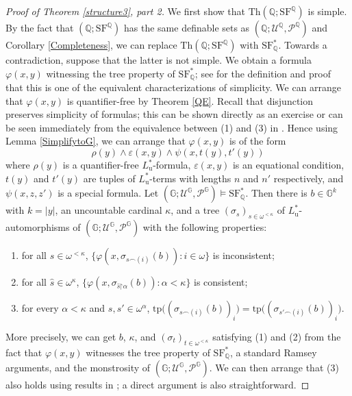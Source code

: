 \documentclass[letterpaper]{amsart}
\newcommand{\res}{\mathord{\upharpoonright}} %
\newcommand{\qq}{\mathbb{Q}}
\renewcommand{\gg}{\mathbb{G}}
\newcommand{\sU}{\mathscr{U}}
\newcommand{\sP}{\mathscr{P}}
\newcommand{\SQ}{\mathrm{SF}^\qq}
\newcommand{\TSFQ}{\mathrm{SF}^*_{\qq}}
\begin{document}
\begin{proof}[Proof of Theorem \ref{structure3}, part 2]
We first show that $\text{Th}(\qq; \SQ)$ is simple. By the fact that $(\qq; \SQ)$ has the same definable sets as $(\qq; \sU^\qq, \sP^\qq)$ and
Corollary \ref{Completeness}, we can replace $\text{Th}(\qq; \SQ)$ with $\TSFQ$. Towards a contradiction, suppose that the latter is not simple. We obtain a formula  $\varphi(x,y)$ witnessing the tree property of $\TSFQ$; see \cite[pp. 24-25]{Kim} for the definition and proof that this is one of the equivalent characterizations of simplicity.
We can arrange that $\varphi(x,y)$ is quantifier-free by  Theorem \ref{QE}. Recall that disjunction preserves simplicity of formulas; this can be shown directly as an exercise or can be seen immediately from the equivalence between (1) and (3) in  \cite[Lemma~2.4.1]{Kim}. Hence using Lemma \ref{SimplifytoG}, we can arrange that $\varphi(x,y)$ is of the form $$  \rho(y) \wedge \varepsilon(x, y)  \wedge \psi(x, t(y), t'(y))  $$
where  $\rho(y)$ is a quantifier-free $L^*_{\mathrm{u}}$-formula,   $\varepsilon(x, y)$ is an equational condition, $t(y)$ and $t'(y)$ are tuples of $L^*_{\mathrm{u}}$-terms with lengths $n$ and $n'$ respectively, and $\psi(x, z, z')$ is a special formula. Let $(\gg; \sU^\gg, \sP^\gg) \models \TSFQ$. Then there is $b \in \gg^k$ with $k=|y|$, an uncountable  cardinal $\kappa$, and a tree $(\sigma_s)_{ s \in \omega^{<\kappa} }$  of $L^*_{\mathrm{u}}$-automorphisms of $(\gg; \sU^\gg, \sP^\gg)$ with the following properties:
\begin{enumerate}
\item for all $s \in \omega^{< \kappa}$, $\{ \varphi(x, \sigma_{s\frown (i)}(b)) : i \in \omega   \}$ is inconsistent;
\item for all $\hat{s} \in \omega^\kappa$, $\{ \varphi(x, \sigma_{\hat{s} \res \alpha}(b)): \alpha <\kappa\}$ is consistent;
\item for every $\alpha<\kappa$ and $s, s' \in \omega^\alpha $, $ \text{tp}\big( (\sigma_{s\frown (i)}(b))_i\big)=\text{tp}\big( (\sigma_{s'\frown (i)}(b))_i\big)$.
\end{enumerate}
More precisely, we can get $b$, $\kappa$, and  $(\sigma_t)_{ t \in \omega^{<\kappa} }$ satisfying (1) and (2) from the fact that $\varphi(x,y)$ witnesses the tree property of $\TSFQ$, a standard Ramsey arguments, and the monstrosity of $(\gg; \sU^\gg, \sP^\gg)$.  We can then arrange that (3) also holds using results in \cite{Kimkimscow}; a direct argument is also straightforward.



\end{proof}
\end{document}
